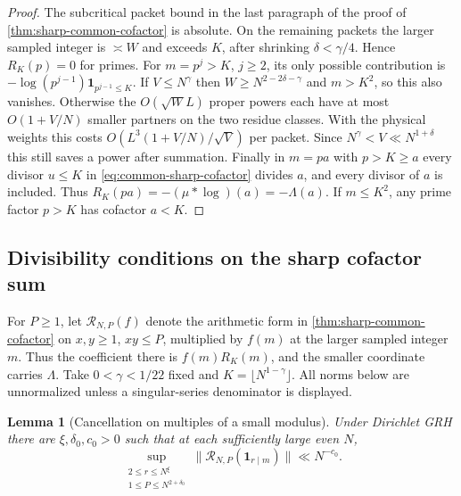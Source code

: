 \documentclass[11pt,a4paper]{article}
\numberwithin{equation}{section}
\newtheorem{lemma}[theorem]{Lemma}
\begin{document}
\begin{proof}
The subcritical packet bound in the last paragraph of the proof
of \cref{thm:sharp-common-cofactor} is absolute. On the remaining
packets the larger sampled integer is $\asymp W$ and exceeds $K$,
after shrinking $\delta<\gamma/4$. Hence $R_K(p)=0$ for primes.
For $m=p^j>K$, $j\ge2$, its only possible contribution is
$-\log(p^{j-1})\mathbf1_{p^{j-1}\le K}$. If $V\le N^\gamma$
then $W\ge N^{2-2\delta-\gamma}$ and $m>K^2$, so this also
vanishes. Otherwise the $O(\sqrt W L)$ proper powers each
have at most $O(1+V/N)$ smaller partners on the two residue
classes. With the physical weights this costs
$O(L^3(1+V/N)/\sqrt V)$ per packet. Since $N^\gamma<V
\ll N^{1+\delta}$ this still saves a power after summation.
Finally in $m=pa$ with $p>K\ge a$ every divisor $u\le K$
in \eqref{eq:common-sharp-cofactor} divides $a$, and every
divisor of $a$ is included. Thus $R_K(pa)=-(\mu*\log)(a)
=-\Lambda(a)$. If $m\le K^2$, any prime factor $p>K$ has
cofactor $a<K$.
\end{proof}

\subsection{Divisibility conditions on the sharp cofactor sum}

For $P\ge1$, let $\mathcal R_{N,P}(f)$ denote the arithmetic form
in \cref{thm:sharp-common-cofactor} on $x,y\ge1$, $xy\le P$,
multiplied by $f(m)$ at the larger sampled integer $m$.
Thus the coefficient there is $f(m)R_K(m)$, and the smaller
coordinate carries $\Lambda$. Take $0<\gamma<1/22$ fixed and
$K=\lfloor N^{1-\gamma}\rfloor$. All norms below are unnormalized
unless a singular-series denominator is displayed.

\begin{lemma}[Cancellation on multiples of a small modulus]
\label{lem:cofactor-multiples}
Under Dirichlet GRH there are $\xi,\delta_0,c_0>0$ such that
at each sufficiently large even $N$,
\[
 \sup_{\substack{2\le r\le N^\xi\\1\le P\le N^{2+\delta_0}}}
     \|\mathcal R_{N,P}(\mathbf1_{r\mid m})\|\ll N^{-c_0}.
\]
\end{lemma}
\end{document}
